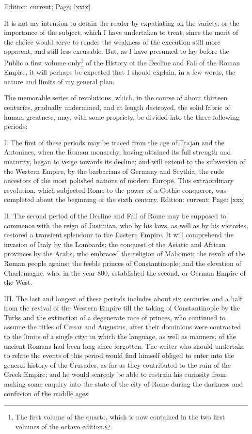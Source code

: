 Edition: current; Page: [xxix]


It is not my intention to detain the reader by expatiating on the variety, or the importance of the subject, which I have undertaken to treat; since the merit of the choice would serve to render the weakness of the execution still more apparent, and still less excusable. But, as I have presumed to lay before the Public a first volume only\footnote{The first volume of the quarto, which is now contained in the two first volumes of the octavo edition.} of the History of the Decline and Fall of the Roman Empire, it will perhaps be expected that I should explain, in a few words, the nature and limits of my general plan.

The memorable series of revolutions, which, in the course of about thirteen centuries, gradually undermined, and at length destroyed, the solid fabric of human greatness, may, with some propriety, be divided into the three following periods:

I. The first of these periods may be traced from the age of Trajan and the Antonines, when the Roman monarchy, having attained its full strength and maturity, began to verge towards its decline; and will extend to the subversion of the Western Empire, by the barbarians of Germany and Scythia, the rude ancestors of the most polished nations of modern Europe. This extraordinary revolution, which subjected Rome to the power of a Gothic conqueror, was completed about the beginning of the sixth century.
Edition: current; Page: [xxx]

II. The second period of the Decline and Fall of Rome may be supposed to commence with the reign of Justinian, who by his laws, as well as by his victories, restored a transient splendour to the Eastern Empire. It will comprehend the invasion of Italy by the Lombards; the conquest of the Asiatic and African provinces by the Arabs, who embraced the religion of Mahomet; the revolt of the Roman people against the feeble princes of Constantinople; and the elevation of Charlemagne, who, in the year 800, established the second, or German Empire of the West.

III. The last and longest of these periods includes about six centuries and a half; from the revival of the Western Empire till the taking of Constantinople by the Turks and the extinction of a degenerate race of princes, who continued to assume the titles of Cæsar and Augustus, after their dominions were contracted to the limits of a single city; in which the language, as well as manners, of the ancient Romans had been long since forgotten. The writer who should undertake to relate the events of this period would find himself obliged to enter into the general history of the Crusades, as far as they contributed to the ruin of the Greek Empire; and he would scarcely be able to restrain his curiosity from making some enquiry into the state of the city of Rome during the darkness and confusion of the middle ages.

